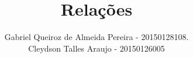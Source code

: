 \title{Relações}
  \author{Gabriel Queiroz de Almeida Pereira - 20150128108.
  \\
  Cleydson Talles Araujo - 20150126005}
  
  \maketitle
    
